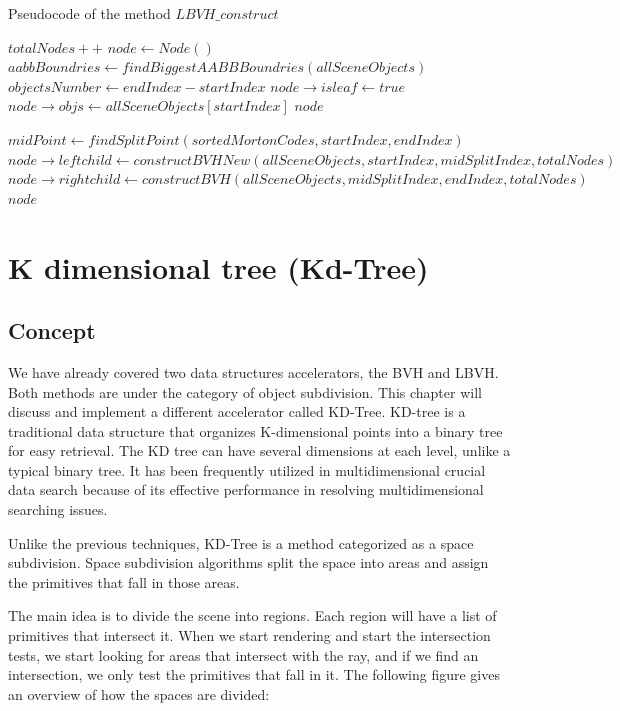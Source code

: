 \documentclass[11pt,a4paper]{article}
\begin{document}
\begin{algorithm}[H]
\caption{Pseudocode of the method $LBVH\_construct$}\label{alg:alg1}
\begin{algorithmic}
\State $totalNodes++$
\State $node \gets Node()$
\State $aabbBoundries \gets findBiggestAABBBoundries(allSceneObjects)$
\State $objectsNumber \gets  endIndex - startIndex$
	\State $node \rightarrow isleaf \gets true$
	\State $node \rightarrow objs \gets allSceneObjects[startIndex]$
	\State \Return $node$
\EndIf

\State $midPoint \gets findSplitPoint(sortedMortonCodes, startIndex, endIndex)$
\State $node \rightarrow leftchild  \gets constructBVHNew(allSceneObjects, startIndex, midSplitIndex, totalNodes)$
\State $node \rightarrow rightchild  \gets constructBVH(allSceneObjects, midSplitIndex, endIndex, totalNodes)$
\State \Return $node$
\EndFunction
\end{algorithmic}
\end{algorithm}
\clearpage



\section{K dimensional tree (Kd-Tree)}
\subsection{Concept}
We have already covered two data structures accelerators, the BVH and LBVH. Both methods are under the category of object subdivision. This chapter will discuss and implement a different accelerator called KD-Tree.
KD-tree is a traditional data structure that organizes K-dimensional points into a binary tree for easy retrieval. The KD tree can have several dimensions at each level, unlike a typical binary tree. It has been frequently utilized in multidimensional crucial data search because of its effective performance in resolving multidimensional searching issues.
\\
\noindent

Unlike the previous techniques, KD-Tree is a method categorized as a space subdivision.
Space subdivision algorithms split the space into areas and assign the primitives that fall in those areas.
\\
\noindent

The main idea is to divide the scene into regions. Each region will have a list of primitives that intersect it. When we start rendering and start the intersection tests, we start looking for areas that intersect with the ray, and if we find an intersection, we only test the primitives that fall in it.
The following figure gives an overview of how the spaces are divided: 
\end{document}
